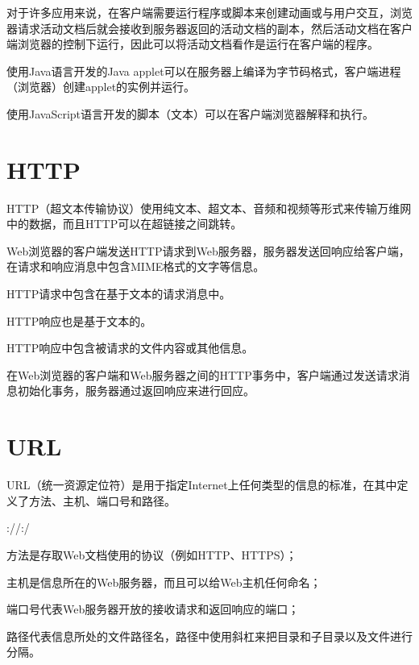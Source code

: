 对于许多应用来说，在客户端需要运行程序或脚本来创建动画或与用户交互，浏览器请求活动文档后就会接收到服务器返回的活动文档的副本，然后活动文档在客户端浏览器的控制下运行，因此可以将活动文档看作是运行在客户端的程序。


\begin{compactitem}
\item 使用Java语言开发的Java applet可以在服务器上编译为字节码格式，客户端进程（浏览器）创建applet的实例并运行。
\item 使用JavaScript语言开发的脚本（文本）可以在客户端浏览器解释和执行。
\end{compactitem}





\section{HTTP}

HTTP（超文本传输协议）使用纯文本、超文本、音频和视频等形式来传输万维网中的数据，而且HTTP可以在超链接之间跳转。

Web浏览器的客户端发送HTTP请求到Web服务器，服务器发送回响应给客户端，在请求和响应消息中包含MIME格式的文字等信息。

\begin{compactitem}
\item HTTP请求中包含在基于文本的请求消息中。
\item HTTP响应也是基于文本的。
\item HTTP响应中包含被请求的文件内容或其他信息。
\end{compactitem}

在Web浏览器的客户端和Web服务器之间的HTTP事务中，客户端通过发送请求消息初始化事务，服务器通过返回响应来进行回应。


\section{URL}

URL（统一资源定位符）是用于指定Internet上任何类型的信息的标准，在其中定义了方法、主机、端口号和路径。

\begin{center}
://:/
\end{center}

\begin{compactitem}
\item 方法是存取Web文档使用的协议（例如HTTP、HTTPS）；
\item 主机是信息所在的Web服务器，而且可以给Web主机任何命名；
\item 端口号代表Web服务器开放的接收请求和返回响应的端口；
\item 路径代表信息所处的文件路径名，路径中使用斜杠来把目录和子目录以及文件进行分隔。
\end{compactitem}



